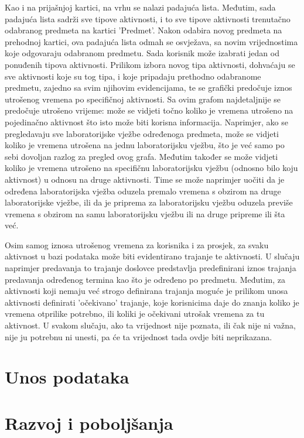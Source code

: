 \documentclass[times, utf8, zavrsni]{fer}
\begin{document}
Kao i na prijašnjoj kartici, na vrhu se nalazi padajuća lista. Međutim, sada padajuća lista sadrži sve tipove aktivnosti, i to sve tipove aktivnosti trenutačno odabranog predmeta na kartici 'Predmet'. Nakon odabira novog predmeta na prehodnoj kartici, ova padajuća lista odmah se osvježava, sa novim vrijednostima koje odgovaraju odabranom predmetu. Sada korisnik može izabrati jedan od ponuđenih tipova aktivnosti. Prilikom izbora novog tipa aktivnosti, dohvaćaju se sve aktivnosti koje su tog tipa, i koje pripadaju prethodno odabranome predmetu, zajedno sa svim njihovim evidencijama, te se grafički predočuje iznos utrošenog vremena po specifičnoj aktivnosti. Sa ovim grafom najdetaljnije se predočuje utrošeno vrijeme: može se vidjeti točno koliko je vremena utrošeno na pojedinačno aktivnost što isto može biti korisna informacija. Naprimjer, ako se pregledavaju sve laboratorijske vježbe određenoga predmeta, može se vidjeti koliko je vremena utrošena na jednu laboratorijsku vježbu, što je već samo po sebi dovoljan razlog za pregled ovog grafa. Međutim također se može vidjeti koliko je vremena utrošeno na specifičnu laboratorijsku vježbu (odnosno bilo koju aktivnost) u odnosu na druge aktivnosti. Time se može naprimjer uočiti da je određena laboratorijska vježba oduzela premalo vremena s obzirom na druge laboratorijske vježbe, ili da je priprema za laboratorijsku vježbu oduzela previše vremena s obzirom na samu laboratorijsku vježbu ili na druge pripreme ili šta već.

Osim samog iznosa utrošenog vremena za korisnika i za prosjek, za svaku aktivnost u bazi podataka može biti evidentirano trajanje te aktivnosti. U slučaju naprimjer predavanja to trajanje doslovce predstavlja predefinirani iznos trajanja predavanja određenog termina kao što je određeno po predmetu. Međutim, za aktivnosti koji nemaju već strogo definirana trajanja moguće je prilikom unosa aktivnosti definirati 'očekivano' trajanje, koje korisnicima daje do znanja koliko je vremena otprilike potrebno, ili koliki je očekivani utrošak vremena za tu aktivnost. U svakom slučaju, ako ta vrijednost nije poznata, ili čak nije ni važna, nije ju potrebnu ni unesti, pa će ta vrijednost tada ovdje biti neprikazana.

\section{Unos podataka}
\section{Razvoj i poboljšanja}
\end{document}
